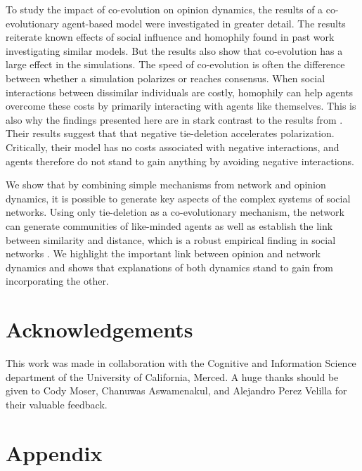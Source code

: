 \documentclass[11pt]{article}
\begin{document}
\noindent To study the impact of co-evolution on opinion dynamics, the results of a co-evolutionary agent-based model were investigated in greater detail. The results reiterate known effects of social influence and homophily found in past work investigating similar models. But the results also show that co-evolution has a large effect in the simulations. The speed of co-evolution is often the difference between whether a simulation polarizes or reaches consensus. When social interactions between dissimilar individuals are costly, homophily can help agents overcome these costs by primarily interacting with agents like themselves. This is also why the findings presented here are in stark contrast to the results from . Their results suggest that that negative tie-deletion accelerates polarization. Critically, their model has no costs associated with negative interactions, and agents therefore do not stand to gain anything by avoiding negative interactions. 

\noindent We show that by combining simple mechanisms from network and opinion dynamics, it is possible to generate key aspects of the complex systems of social networks. Using only tie-deletion as a co-evolutionary mechanism, the network can generate communities of like-minded agents as well as establish the link between similarity and distance, which is a robust empirical finding in social networks \cite{kossinets_origins_2009}.
We highlight the important link between opinion and network dynamics and shows that explanations of both dynamics stand to gain from incorporating the other. 

\section{Acknowledgements}
This work was made in collaboration with the Cognitive and Information Science department of the University of California, Merced. A huge thanks should be given to Cody Moser, Chanuwas Aswamenakul, and Alejandro Perez Velilla for their valuable feedback. 





\appendix
\section{Appendix}
\label{appendix}
\renewcommand\thefigure{\thesection.\arabic{figure}}    
\setcounter{figure}{0}  
\end{document}

